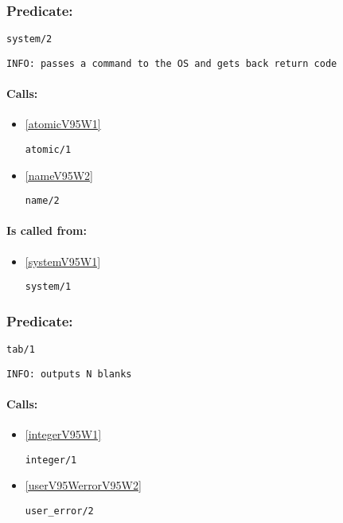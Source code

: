 \subsubsection{Predicate:} \label{systemV95W2}

\begin{verbatim}
system/2
\end{verbatim}

{\small \begin{verbatim}
INFO: passes a command to the OS and gets back return code

\end{verbatim}}
\paragraph{Calls:} 
\begin{itemize}
\item \ref{atomicV95W1} 
\begin{verbatim}
atomic/1
\end{verbatim}

\item \ref{nameV95W2} 
\begin{verbatim}
name/2
\end{verbatim}

\end{itemize}
\paragraph{Is called from:} 
\begin{itemize}
\item \ref{systemV95W1} 
\begin{verbatim}
system/1
\end{verbatim}

\end{itemize}

\subsubsection{Predicate:} \label{tabV95W1}

\begin{verbatim}
tab/1
\end{verbatim}

{\small \begin{verbatim}
INFO: outputs N blanks

\end{verbatim}}
\paragraph{Calls:} 
\begin{itemize}
\item \ref{integerV95W1} 
\begin{verbatim}
integer/1
\end{verbatim}

\item \ref{userV95WerrorV95W2} 
\begin{verbatim}
user_error/2
\end{verbatim}

\end{itemize}

